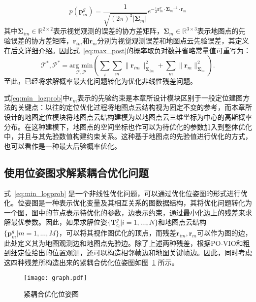 \begin{equation}
  p(\symbf{p}_m^g) = \frac{1}{\sqrt{(2\pi)^3|\symbf{\Sigma}_m|}}e^{-\frac{1}{2}\symbf{r}_{m}^T \cdot {\symbf{\Sigma}_{m}}^{-1} \cdot \symbf{r}_{m}}
\end{equation}
其中$\symbf{\Sigma}_{im}\in \mathbb{R}^{2\times 2}$表示视觉观测的误差的协方差矩阵，$\symbf{\Sigma}_{m} \in \mathbb{R}^{3 \times 3}$表示地图点的先验误差的协方差矩阵，$\symbf{r}_{im}$和$\symbf{r}_m$分别为视觉观测误差和地图点云先验误差，其定义在后文详细介绍。因此式~\eqref{eq:max_post}的概率取负对数并省略常量值可重写为：
\begin{equation}
\label{eq:min_logprob}
\mathcal{T}^*, \mathcal{P}^* = \underset{\mathcal{T}, \mathcal{P}}{\text{arg min}} \left( \sum_i \sum_m \| \symbf{r}_{im} \|_{\symbf{\Sigma}_{im}}^2 + \sum_m \| \symbf{r}_m \|_{\symbf{\Sigma}_{m}}^2 \right).
\end{equation}
至此，已经将求解概率最大化问题转化为优化非线性残差问题。

式\eqref{eq:min_logprob}中$\symbf{r}_{m}$表示的先验约束是本章所设计模块区别于一般定位建图方法的关键点：以往的定位优化过程将地图点云结构视为固定不变的参考，而本章所设计的地图定位模块将地图点云结构建模为以地图点云三维坐标为中心的高斯概率分布。在这种建模下，地图点的空间坐标也作可以为待优化的参数加入到整体优化中，并且与其先验数值构建约束关系。这种基于地图点的先验值进行优化的方式，也可以看作是一种最大后验概率优化。

\subsection{使用位姿图求解紧耦合优化问题}
\label{sec:loc_pg}

式~\eqref{eq:min_logprob} 是一个非线性优化问题，可以通过优化位姿图的形式进行优化。位姿图是一种表示优化变量及其相互关系的图数据结构，其将优化问题转化为一个图，图中的节点表示待优化的参数，边表示约束，通过最小化边上的残差来求解最优参数。因此，如果求解位姿$\{ \symbf{T}_{c_i}^g | i=1,\dots, N\}$和地图点云结构$\{\symbf{p}^g_m | m = 1, \dots, M\}$，可以将其视作图优化的顶点，而残差$\symbf{r}_{im}, \symbf{r}_m$可以作为图的边，此处定义其为地图观测边和地图点先验边。除了上述两种残差，根据PO-VIO和粗到细定位给出的位置观测，还可以构造相邻帧边和地图关键帧边。因此，同时考虑这四种残差所构造出来的紧耦合优化位姿图如图~\ref{fig:graph} 所示。

\begin{figure}
  \centering
  \texttt{[image: graph.pdf]}
  \caption{紧耦合优化位姿图}
  \label{fig:graph}
\end{figure}

